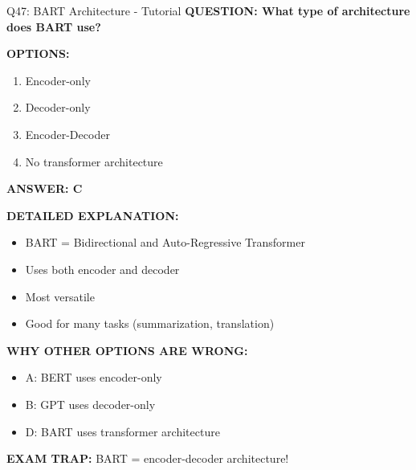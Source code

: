 \documentclass[8pt]{beamer}
\begin{document}
	\begin{frame}{Q47: BART Architecture - Tutorial}
		\fontsize{6.5}{7.5}\selectfont
		\textbf{QUESTION: What type of architecture does BART use?}
		
		\vspace{0.1cm}
		\textbf{OPTIONS:}
		\begin{enumerate}
			\item Encoder-only
			\item Decoder-only
			\item Encoder-Decoder
			\item No transformer architecture
		\end{enumerate}
		
		\vspace{0.1cm}
		\textcolor{myblue}{\textbf{ANSWER: C}}
		
		\vspace{0.1cm}
		\textbf{DETAILED EXPLANATION:}
		\begin{itemize}
			\item BART = Bidirectional and Auto-Regressive Transformer
			\item Uses both encoder and decoder
			\item Most versatile
			\item Good for many tasks (summarization, translation)
		\end{itemize}
		
		\vspace{0.1cm}
		\textcolor{myred}{\textbf{WHY OTHER OPTIONS ARE WRONG:}}
		\begin{itemize}
			\item \textcolor{myred}{A:} BERT uses encoder-only
			\item \textcolor{myred}{B:} GPT uses decoder-only
			\item \textcolor{myred}{D:} BART uses transformer architecture
		\end{itemize}
		
		\textcolor{myred}{\textbf{EXAM TRAP:}} BART = \textcolor{myblue}{encoder-decoder} architecture!
	\end{frame}
	
\end{document}
